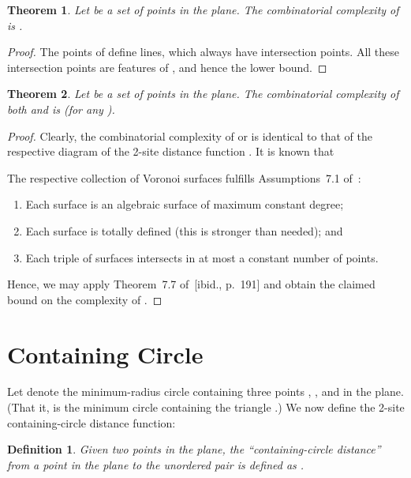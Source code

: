 \documentclass[10pt, conference, compsocconf]{IEEEtran}
\newtheorem{theorem}{Theorem}
\newtheorem{definition}{Definition}
\begin{document}
\begin{theorem}
   Let  be a set of  points in the plane.
   The combinatorial complexity of  is .
\end{theorem}

\begin{proof}
   The  points of  define  lines, which always have
    intersection points.  All these intersection points
   are features of , and hence the lower bound.
\end{proof}

\begin{theorem}
   \label{TH-ub-circ}
   Let  be a set of  points in the plane.
   The combinatorial complexity of both  and
    is  (for any ).
\end{theorem}

\begin{proof}
   Clearly, the combinatorial complexity of  or
    is identical to that of the respective diagram of
   the 2-site distance function
   .
   It is known that
   
   The respective collection of  Voronoi surfaces
   fulfills Assumptions~7.1 of~\cite[p.~188]{SA95}:
   \begin{enumerate}
   \item Each surface is an algebraic surface of maximum constant degree;
   \item Each surface is totally defined (this is stronger than needed); and
   \item Each triple of surfaces intersects in at most a constant number
         of points.
   \end{enumerate}
   Hence, we may apply Theorem~7.7 of~[ibid., p.~191] and
   obtain the claimed bound on the complexity of .
\end{proof}



\section{Containing Circle}

\label{S-contain-cir}

Let  denote the minimum-radius circle
containing three points , , and  in the plane.
(That it,  is the minimum circle containing the triangle
.)
We now define the 2-site containing-circle distance function:
\begin{definition}
   Given two points  in the plane, the ``containing-circle distance''
    from a point  in the plane to the unordered pair  is
   defined as .
\end{definition}
\end{document}
